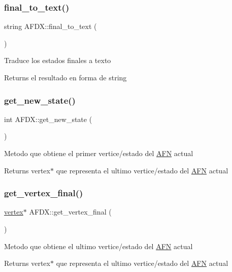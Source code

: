 \subsubsection{\texorpdfstring{final\+\_\+to\+\_\+text()}{final\_to\_text()}}
{\footnotesize\ttfamily string A\+F\+D\+X\+::final\+\_\+to\+\_\+text (\begin{DoxyParamCaption}{ }\end{DoxyParamCaption})}

Traduce los estados finales a texto \begin{DoxyReturn}{Returns}
el resultado en forma de string 
\end{DoxyReturn}
\hypertarget{class_a_f_d_x_a5f578f0b5ac5b77d800aa765626f94e1}{}\label{class_a_f_d_x_a5f578f0b5ac5b77d800aa765626f94e1} 
\subsubsection{\texorpdfstring{get\+\_\+new\+\_\+state()}{get\_new\_state()}}
{\footnotesize\ttfamily int A\+F\+D\+X\+::get\+\_\+new\+\_\+state (\begin{DoxyParamCaption}{ }\end{DoxyParamCaption})}

Metodo que obtiene el primer vertice/estado del \hyperlink{class_a_f_n}{A\+FN} actual \begin{DoxyReturn}{Returns}
vertex$\ast$ que representa el ultimo vertice/estado del \hyperlink{class_a_f_n}{A\+FN} actual 
\end{DoxyReturn}
\hypertarget{class_a_f_d_x_ac7b12b227145c478fca9a00f785656ab}{}\label{class_a_f_d_x_ac7b12b227145c478fca9a00f785656ab} 
\subsubsection{\texorpdfstring{get\+\_\+vertex\+\_\+final()}{get\_vertex\_final()}}
{\footnotesize\ttfamily \hyperlink{structvertex}{vertex}$\ast$ A\+F\+D\+X\+::get\+\_\+vertex\+\_\+final (\begin{DoxyParamCaption}{ }\end{DoxyParamCaption})}

Metodo que obtiene el ultimo vertice/estado del \hyperlink{class_a_f_n}{A\+FN} actual \begin{DoxyReturn}{Returns}
vertex$\ast$ que representa el ultimo vertice/estado del \hyperlink{class_a_f_n}{A\+FN} actual 
\end{DoxyReturn}
\hypertarget{class_a_f_d_x_aa78cba34334092271a7cffc86a8cd344}{}\label{class_a_f_d_x_aa78cba34334092271a7cffc86a8cd344} 

